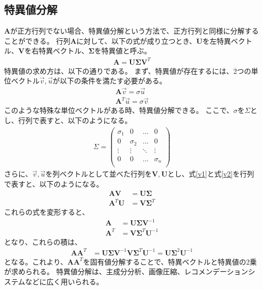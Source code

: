 \documentclass{ltjsarticle}
\begin{document}
\subsection{特異値分解}
$\mathbf{A}$が正方行列でない場合、特異値分解という方法で、正方行列と同様に分解することができる。
行列$\mathbf{A}$に対して、以下の式が成り立つとき、$\mathbf{U}$を左特異ベクトル、$\mathbf{V}$を右特異ベクトル、$\mathbf{\Sigma}$を特異値と呼ぶ。
\begin{align}
\mathbf{A} = \mathbf{U} \mathbf{\Sigma} \mathbf{V}^T
\end{align}
特異値の求め方は、以下の通りである。
まず、特異値が存在するには、2つの単位ベクトル$\vec{v}, \vec{u}$が以下の条件を満たす必要がある。
\begin{align}
\mathbf{A} \vec{v} = \sigma \vec{u} \label{v1}\\
\mathbf{A}^T \vec{u} = \sigma \vec{v} \label{v2}
\end{align}
このような特殊な単位ベクトルがある時、特異値分解できる。
ここで、$\sigma$を$\Sigma$とし、行列で表すと、以下のようになる。
\begin{align}
\Sigma = \begin{pmatrix}
  \sigma_1 & 0 & \dots & 0 \\
  0 & \sigma_2 & \dots & 0 \\
  \vdots & \vdots & \ddots & \vdots \\
  0 & 0 & \dots & \sigma_n \\
\end{pmatrix}
\end{align}
さらに、$\vec{v}, \vec{u}$を列ベクトルとして並べた行列を$\mathbf{V}, \mathbf{U}$とし、式\eqref{v1}と式\eqref{v2}を行列で表すと、以下のようになる。
\begin{align}
\mathbf{A} \mathbf{V} &= \mathbf{U} \mathbf{\Sigma} \\
\mathbf{A}^T \mathbf{U} &= \mathbf{V} \mathbf{\Sigma}^T
\end{align}
これらの式を変形すると、
\begin{align}
\mathbf{A} &= \mathbf{U} \mathbf{\Sigma} \mathbf{V}^{-1}\\
\mathbf{A}^T &= \mathbf{V} \mathbf{\Sigma}^T \mathbf{U}^{-1}
\end{align}
となり、これらの積は、
\begin{align}
\mathbf{A} \mathbf{A}^T &= \mathbf{U} \mathbf{\Sigma} \mathbf{V}^{-1} \mathbf{V} \mathbf{\Sigma}^T \mathbf{U}^{-1} = \mathbf{U} \mathbf{\Sigma}^2 \mathbf{U}^{-1}
\end{align}
となる。これより、$\mathbf{A} \mathbf{A}^T$を固有値分解することで、特異ベクトルと特異値の2乗が求められる。
特異値分解は、主成分分析、画像圧縮、レコメンデーションシステムなどに広く用いられる。
\end{document}
